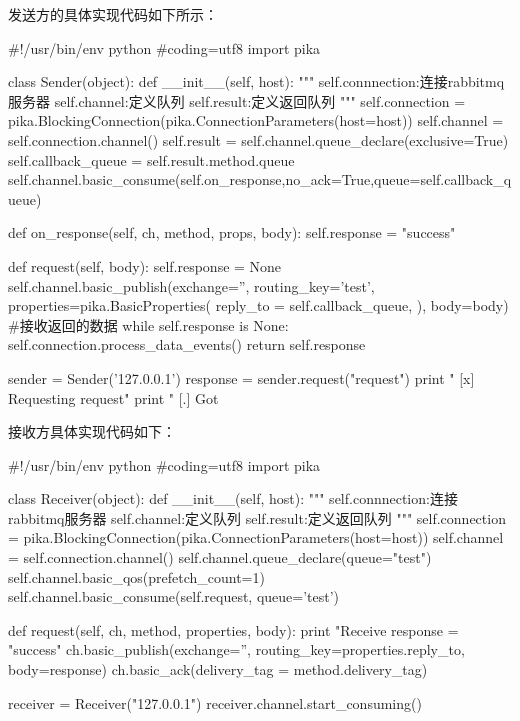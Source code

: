 发送方的具体实现代码如下所示：

\begin{python} 
#!/usr/bin/env python
#coding=utf8
import pika
 
class Sender(object):
    def __init__(self, host):
        """
        self.connnection:连接rabbitmq服务器
        self.channel:定义队列
        self.result:定义返回队列
        """
        self.connection = pika.BlockingConnection(pika.ConnectionParameters(host=host))
        self.channel = self.connection.channel()
        self.result = self.channel.queue_declare(exclusive=True)
        self.callback_queue = self.result.method.queue
        self.channel.basic_consume(self.on_response,no_ack=True,queue=self.callback_queue)
 
    def on_response(self, ch, method, props, body):
        self.response = "success"

    def request(self, body):
        self.response = None
        self.channel.basic_publish(exchange='',
                                   routing_key='test',
                                   properties=pika.BasicProperties(
                                         reply_to = self.callback_queue,
                                         ),
                                   body=body)
        #接收返回的数据
        while self.response is None:
            self.connection.process_data_events()
        return self.response
 
sender = Sender('127.0.0.1')
response = sender.request("request")
print " [x] Requesting request"
print " [.] Got %

\end{python}  

接收方具体实现代码如下：

\begin{python} 
#!/usr/bin/env python
#coding=utf8
import pika

class Receiver(object):
  def __init__(self, host):
    """
    self.connnection:连接rabbitmq服务器
    self.channel:定义队列
    self.result:定义返回队列
    """
    self.connection =  pika.BlockingConnection(pika.ConnectionParameters(host=host))
    self.channel = self.connection.channel()
    self.channel.queue_declare(queue="test")
    self.channel.basic_qos(prefetch_count=1)
    self.channel.basic_consume(self.request, queue='test')

  def request(self, ch, method, properties, body):
    print "Receive %
    response = "success"
    ch.basic_publish(exchange='',
            routing_key=properties.reply_to,
                      body=response)
    ch.basic_ack(delivery_tag = method.delivery_tag)

receiver = Receiver("127.0.0.1")
receiver.channel.start_consuming()
\end{python}  

